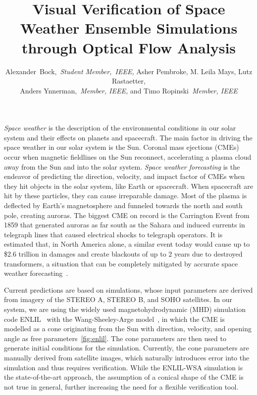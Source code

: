 \documentclass[journal]{vgtc}                %
\title{Visual Verification of Space Weather Ensemble Simulations through Optical Flow Analysis}
\author{
    Alexander~Bock,~\textit{Student Member,~IEEE,}
    Asher Pembroke,
    M. Leila Mays,
    Lutz Rastaetter,\\%
    Anders Ynnerman,~\textit{Member, IEEE,}
    and Timo Ropinski~\textit{Member, IEEE}%
}
\begin{document}
\maketitle
\emph{Space weather} is the description of the environmental conditions in our solar system and their effects on planets and spacecraft. The main factor in driving the space weather in our solar system is the Sun. Coronal mass ejections (CMEs) occur when magnetic fieldlines on the Sun reconnect, accelerating a plasma cloud away from the Sun and into the solar system. \emph{Space weather forecasting} is the endeavor of predicting the direction, velocity, and impact factor of CMEs when they hit objects in the solar system, like Earth or spacecraft. When spacecraft are hit by these particles, they can cause irreparable damage. Most of the plasma is deflected by Earth's magnetosphere and funneled towards the north and south pole, creating auroras. The biggest CME on record is the Carrington Event from 1859 that generated auroras as far south as the Sahara and induced currents in telegraph lines that caused electrical shocks to telegraph operators. It is estimated that, in North America alone, a similar event today would cause up to \$2.6 trillion in damages and create blackouts of up to 2 years due to destroyed transformers, a situation that can be completely mitigated by accurate space weather forecasting~\cite{lloyds2013impact}.

Current predictions are based on simulations, whose input parameters are derived from imagery of the STEREO A, STEREO B, and SOHO satellites. In our system, we are using the widely used magnetohydrodynamic (MHD) simulation code ENLIL~\cite{odstrcil2003modeling} with the Wang-Sheeley-Arge model~\cite{parsons2011wang}, in which the CME is modelled as a cone originating from the Sun with direction, velocity, and opening angle as free parameters~\ref{fig:enlil}. The cone parameters are then used to generate initial conditions for the simulation. Currently, the cone parameters are manually derived from satellite images, which naturally introduces error into the simulation and thus requires verification. While the ENLIL-WSA simulation is the state-of-the-art approach, the assumption of a conical shape of the CME is not true in general, further increasing the need for a flexible verification tool.
\end{document}
